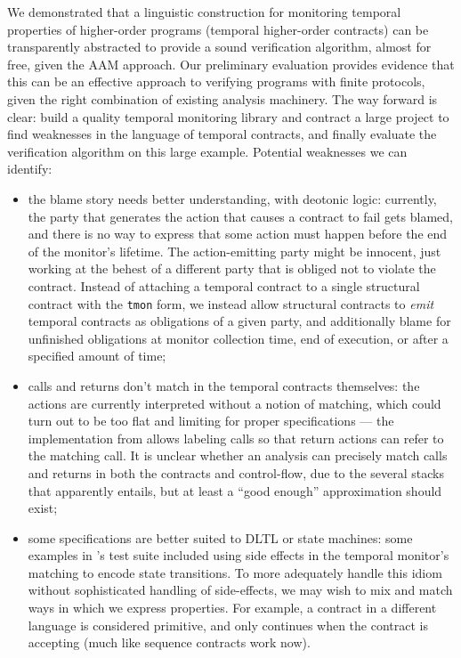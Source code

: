 We demonstrated that a linguistic construction for monitoring temporal properties of higher-order programs (temporal higher-order contracts) can be transparently abstracted to provide a sound verification algorithm, almost for free, given the AAM approach.
%
Our preliminary evaluation provides evidence that this can be an effective approach to verifying programs with finite protocols, given the right combination of existing analysis machinery.
%
The way forward is clear: build a quality temporal monitoring library and contract a large project to find weaknesses in the language of temporal contracts, and finally evaluate the verification algorithm on this large example.
%
Potential weaknesses we can identify:
\begin{itemize}
\item{the blame story needs better understanding, with deotonic logic:
%
currently, the party that generates the action that causes a contract to fail gets blamed, and there is no way to express that some action must happen before the end of the monitor's lifetime.
%
The action-emitting party might be innocent, just working at the behest of a different party that is obliged not to violate the contract.
%
Instead of attaching a temporal contract to a single structural contract with the {\tt tmon} form, we instead allow structural contracts to \emph{emit} temporal contracts as obligations of a given party, and additionally blame for unfinished obligations at monitor collection time, end of execution, or after a specified amount of time;
}
%
\item{calls and returns don't match in the temporal contracts themselves:
%
the actions are currently interpreted without a notion of matching, which could turn out to be too flat and limiting for proper specifications --- the implementation from \dfm{} allows labeling calls so that return actions can refer to the matching call.
%
It is unclear whether an analysis can precisely match calls and returns in both the contracts and control-flow, due to the several stacks that apparently entails, but at least a ``good enough'' approximation should exist;
}
%
\item{some specifications are better suited to DLTL or state machines:
%
some examples in \dfm's test suite included using side effects in the temporal monitor's matching to encode state transitions.
To more adequately handle this idiom without sophisticated handling of side-effects, we may wish to mix and match ways in which we express properties.
%
For example, a contract in a different language is considered primitive, and only continues when the contract is accepting (much like sequence contracts work now).
}
\end{itemize}
